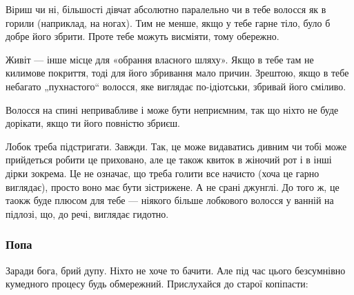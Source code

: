 Віриш чи ні, більшості дівчат абсолютно паралельно чи в тебе волосся як
в горили (наприклад, на ногах). Тим не менше, якщо у тебе гарне тіло, було б
добре його збрити. Проте тебе можуть висміяти, тому обережно.

Живіт — інше місце для «обрання власного шляху». Якщо в тебе там не килимове
покриття, тоді для його збривання мало причин. Зрештою, якщо в тебе небагато
„пухнастого“ волосся, яке виглядає по-ідіотськи, збривай його сміливо.

Волосся на спині непривабливе і може бути неприємним, так що ніхто не буде
дорікати, якщо ти його повністю збриєш.

Лобок треба підстригати. Завжди. Так, це може видаватись дивним чи тобі може
прийдеться робити це приховано, але це також квиток в жіночий рот і в інші
дірки зокрема. Це не означає, що треба голити все начисто (хоча це гарно
виглядає), просто воно має бути зістрижене. А не срані джунглі. До того ж, це
таокж буде плюсом для тебе — ніякого більше лобкового волосся у ванній на
підлозі, що, до речі, виглядає гидотно.

\subsubsection{Попа}
Заради бога, брий дупу. Ніхто не хоче то бачити. Але під час цього безсумнівно
кумедного процесу будь обмережний. Прислухайся до старої копіпасти:

